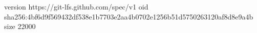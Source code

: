 version https://git-lfs.github.com/spec/v1
oid sha256:4bf6d9f569432df538e1b7703e2aa4b0702e1256b51d5750263120af8d8e9a4b
size 22000
